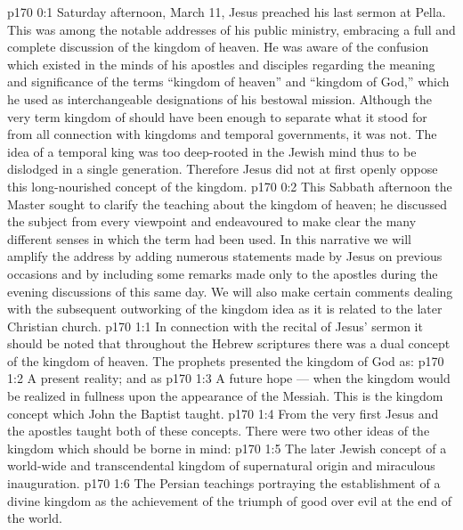 \author{Midwayer Commission}
\vs p170 0:1 Saturday afternoon, March 11, Jesus preached his last sermon at Pella. This was among the notable addresses of his public ministry, embracing a full and complete discussion of the kingdom of heaven. He was aware of the confusion which existed in the minds of his apostles and disciples regarding the meaning and significance of the terms “kingdom of heaven” and “kingdom of God,” which he used as interchangeable designations of his bestowal mission. Although the very term kingdom of  should have been enough to separate what it stood for from all connection with  kingdoms and temporal governments, it was not. The idea of a temporal king was too deep\hyp{}rooted in the Jewish mind thus to be dislodged in a single generation. Therefore Jesus did not at first openly oppose this long\hyp{}nourished concept of the kingdom.
\vs p170 0:2 This Sabbath afternoon the Master sought to clarify the teaching about the kingdom of heaven; he discussed the subject from every viewpoint and endeavoured to make clear the many different senses in which the term had been used. In this narrative we will amplify the address by adding numerous statements made by Jesus on previous occasions and by including some remarks made only to the apostles during the evening discussions of this same day. We will also make certain comments dealing with the subsequent outworking of the kingdom idea as it is related to the later Christian church.
\vs p170 1:1 In connection with the recital of Jesus’ sermon it should be noted that throughout the Hebrew scriptures there was a dual concept of the kingdom of heaven. The prophets presented the kingdom of God as:
\vs p170 1:2 \bibnobreakspace A present reality; and as
\vs p170 1:3 \bibnobreakspace A future hope --- when the kingdom would be realized in fullness upon the appearance of the Messiah. This is the kingdom concept which John the Baptist taught.
\vs p170 1:4 From the very first Jesus and the apostles taught both of these concepts. There were two other ideas of the kingdom which should be borne in mind:
\vs p170 1:5 \bibnobreakspace The later Jewish concept of a world\hyp{}wide and transcendental kingdom of supernatural origin and miraculous inauguration.
\vs p170 1:6 \bibnobreakspace The Persian teachings portraying the establishment of a divine kingdom as the achievement of the triumph of good over evil at the end of the world.
